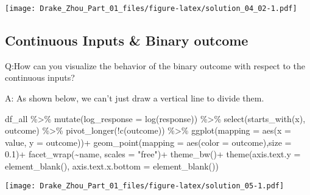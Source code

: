 \documentclass[
]{article}
\newenvironment{Shaded}{\begin{snugshade}}{\end{snugshade}}
\newcommand{\AttributeTok}[1]{\textcolor[rgb]{0.77,0.63,0.00}{#1}}
\newcommand{\FloatTok}[1]{\textcolor[rgb]{0.00,0.00,0.81}{#1}}
\newcommand{\FunctionTok}[1]{\textcolor[rgb]{0.00,0.00,0.00}{#1}}
\newcommand{\NormalTok}[1]{#1}
\newcommand{\SpecialCharTok}[1]{\textcolor[rgb]{0.00,0.00,0.00}{#1}}
\newcommand{\StringTok}[1]{\textcolor[rgb]{0.31,0.60,0.02}{#1}}
\begin{document}
\texttt{[image: Drake\_Zhou\_Part\_01\_files/figure-latex/solution\_04\_02-1.pdf]}

\hypertarget{continuous-inputs-binary-outcome}{%
\subsection{Continuous Inputs \& Binary
outcome}\label{continuous-inputs-binary-outcome}}

Q:How can you visualize the behavior of the binary outcome with respect
to the continuous inputs?

A: As shown below, we can't just draw a vertical line to divide them.

\begin{Shaded}
\begin{Highlighting}[]
\NormalTok{df\_all }\SpecialCharTok{\%\textgreater{}\%}
  \FunctionTok{mutate}\NormalTok{(}\AttributeTok{log\_response =} \FunctionTok{log}\NormalTok{(response)) }\SpecialCharTok{\%\textgreater{}\%}
  \FunctionTok{select}\NormalTok{(}\FunctionTok{starts\_with}\NormalTok{(}\StringTok{\textquotesingle{}x\textquotesingle{}}\NormalTok{), outcome) }\SpecialCharTok{\%\textgreater{}\%}
  \FunctionTok{pivot\_longer}\NormalTok{(}\SpecialCharTok{!}\FunctionTok{c}\NormalTok{(outcome)) }\SpecialCharTok{\%\textgreater{}\%}
  \FunctionTok{ggplot}\NormalTok{(}\AttributeTok{mapping =} \FunctionTok{aes}\NormalTok{(}\AttributeTok{x =}\NormalTok{ value, }\AttributeTok{y =}\NormalTok{ outcome))}\SpecialCharTok{+}
  \FunctionTok{geom\_point}\NormalTok{(}\AttributeTok{mapping =} \FunctionTok{aes}\NormalTok{(}\AttributeTok{color =}\NormalTok{ outcome),}\AttributeTok{size =} \FloatTok{0.1}\NormalTok{)}\SpecialCharTok{+}
  \FunctionTok{facet\_wrap}\NormalTok{(}\SpecialCharTok{\textasciitilde{}}\NormalTok{name, }\AttributeTok{scales =} \StringTok{"free"}\NormalTok{)}\SpecialCharTok{+}
  \FunctionTok{theme\_bw}\NormalTok{()}\SpecialCharTok{+}
  \FunctionTok{theme}\NormalTok{(}\AttributeTok{axis.text.y =} \FunctionTok{element\_blank}\NormalTok{(), }\AttributeTok{axis.text.x.bottom =} \FunctionTok{element\_blank}\NormalTok{())}
\end{Highlighting}
\end{Shaded}

\texttt{[image: Drake\_Zhou\_Part\_01\_files/figure-latex/solution\_05-1.pdf]}
\end{document}
